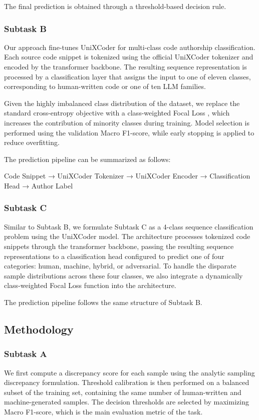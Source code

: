 \documentclass[11pt]{article}
\begin{document}
The final prediction is obtained through a threshold-based decision rule.


\subsubsection{ Subtask B} Our approach fine-tunes UniXCoder \cite{guo2022unixcoderunifiedcrossmodalpretraining} for multi-class code authorship classification. Each source code snippet is tokenized using the official UniXCoder tokenizer and encoded by the transformer backbone. The resulting sequence representation is processed by a classification layer that assigns the input to one of eleven classes, corresponding to human-written code or one of ten LLM families.

Given the highly imbalanced class distribution of the dataset, we replace the standard cross-entropy objective with a class-weighted Focal Loss \cite{lin2018focallossdenseobject}, which increases the contribution of minority classes during training. Model selection is performed using the validation Macro F1-score, while early stopping is applied to reduce overfitting.

The prediction pipeline can be summarized as follows:

Code Snippet → UniXCoder Tokenizer → UniXCoder Encoder → Classification Head → Author Label

\subsubsection{ Subtask C}
Similar to Subtask B, we formulate Subtask C as a 4-class sequence classification problem using the UniXCoder \cite{guo2022unixcoderunifiedcrossmodalpretraining} model. The architecture processes tokenized code snippets through the transformer backbone, passing the resulting sequence representations to a classification head configured to predict one of four categories: human, machine, hybrid, or adversarial. To handle the disparate sample distributions across these four classes, we also integrate a dynamically class-weighted Focal Loss \cite{lin2018focallossdenseobject} function into the architecture.

The prediction pipeline follows the same structure of Subtask B.

\subsection{Methodology}
\subsubsection{ Subtask A}
We first compute a discrepancy score for each sample using the analytic sampling discrepancy formulation. Threshold calibration is then performed on a balanced subset of the training set, containing the same number of human-written and machine-generated samples. The decision thresholds are selected by maximizing Macro F1-score, which is the main evaluation metric of the task.
\end{document}
